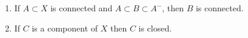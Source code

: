 \begin{enumerate}
    \item[(a)] If $A \subset X$ is connected and $A \subset B \subset A^{-}$, then $B$ is connected.
    \item[(b)] If $C$ is a component of $X$ then $C$ is closed.
\end{enumerate}

